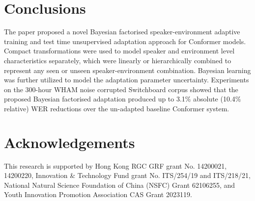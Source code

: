 \documentclass{INTERSPEECH2023}
\begin{document}
\section{Conclusions}
\vspace{-0.05cm}
The paper proposed a novel Bayesian factorised speaker-environment adaptive training and test time unsupervised adaptation approach for Conformer models. Compact transformations were used to model speaker and environment level characteristics separately, which were linearly or hierarchically combined to represent any seen or unseen speaker-environment combination. Bayesian learning was further utilized to model the adaptation parameter uncertainty. Experiments on the 300-hour WHAM noise corrupted Switchboard corpus showed that the proposed Bayesian factorised adaptation produced up to 3.1\% absolute (10.4\% relative) WER reductions over the un-adapted baseline Conformer system. 

\vspace{-0.2cm}
\section{Acknowledgements}
\vspace{-0.05cm}
This research is supported by Hong Kong RGC GRF grant No. 14200021, 14200220, Innovation \& Technology Fund grant No. ITS/254/19 and ITS/218/21, National Natural Science Foundation of China (NSFC) Grant 62106255, and Youth Innovation Promotion Association CAS Grant 2023119.




\end{document}
